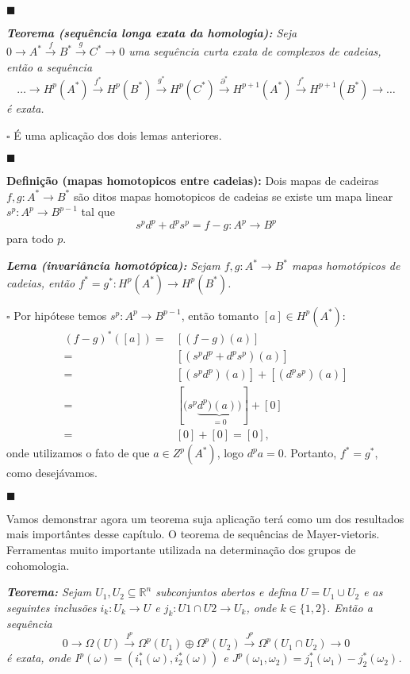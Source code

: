 \documentclass{article}
\begin{document}
	$\blacksquare$
	
	\vspace{2mm}
	\textit{\textbf{Teorema (sequência longa exata da homologia):} Seja $0 \to A^{*} \xrightarrow{f} B^{*} \xrightarrow{g} C^{*} \to 0$ uma sequência curta exata de complexos de cadeias, então a sequência
	$$
	\dots \to H^{p}(A^{*}) \xrightarrow{f^{*}} H^{p}(B^{*}) \xrightarrow{g^{*}} H^{p}(C^{*}) \xrightarrow{\partial^{*}} H^{p+1}(A^{*}) \xrightarrow{f^{*}} H^{p+1}(B^{*}) \to \dots
	$$
	é exata.}
	
	$\square$ É uma aplicação dos dois lemas anteriores. 
	
	$\blacksquare$
	
	\vspace{2mm}
	\textbf{Definição (mapas homotopicos entre cadeias):} Dois mapas de cadeiras $f,g : A^{*} \to B^{*}$ são ditos mapas homotopicos de cadeias se existe um mapa linear $s^{p}: A^{p} \to B^{p-1}$ tal que
	$$
	s^{p}d^{p} + d^{p}s^{p} = f-g : A^{p} \to B^{p}
	$$
	para todo $p$.
	
	\vspace{2mm}
	\textit{\textbf{Lema (invariância homotópica):} Sejam $f,g : A^{*} \to B^{*}$ mapas homotópicos de cadeias, então $f^{*} = g^{*}: H^{p}(A^{*}) \to H^{p}(B^{*})$.}
	
	$\square$ Por hipótese temos $s^{p}: A^{p} \to B^{p-1}$, então tomanto $[a] \in H^{p}(A^{*})$:
	$$
	\begin{aligned}
	(f-g)^{*}([a]) =& [(f-g)(a)]
	\\
	=& [(s^{p}d^{p} + d^{p}s^{p})(a)]
	\\
	=& [(s^{p}d^{p})(a)] + [(d^{p}s^{p})(a)]
	\\
	=& [(s^{p} \underbrace{d^{p})(a))}_{
		=0}] +[0]
	\\
	=& [0]+[0] = [0],
	\end{aligned}
	$$ 
	onde utilizamos o fato de que $a\in Z^{p}(A^{*})$, logo $d^{p}a = 0$. Portanto, $f^{*} = g^{*}$, como desejávamos. 
	
	$\blacksquare$
	
	Vamos demonstrar agora um teorema suja aplicação terá como um dos resultados mais importântes desse capítulo. O teorema de sequências de Mayer-vietoris. Ferramentas muito importante utilizada na determinação dos grupos de cohomologia.
	
	\vspace{2mm}
	\textit{\textbf{Teorema:} Sejam $U_{1}, U_{2} \subseteq \mathbb{R}^{n}$ subconjuntos abertos e defina $U=U_{1} \cup U_{2}$ e as seguintes inclusões $i_{k}: U_{k} \to U$ e $j_{k}: U{1}\cap U{2} \to U_{k}$, onde $k \in \{1,2\}$. Então a sequência
	$$
	0 \to \Omega(U) \xrightarrow{I^{p}} \Omega^{p}(U_{1}) \oplus \Omega^{p}(U_{2}) \xrightarrow{J^{p}} \Omega^{p}(U_{1} \cap U_{2}) \to 0 
	$$
	é exata, onde $I^{p}(\omega) = (i^{*}_{1}(\omega), i^{*}_{2}(\omega))$ e $J^{p}(\omega_{1}, \omega_{2}) = j^{*}_{1}(\omega_{1})- j^{*}_{2}(\omega_{2})$.}
	
\end{document}
